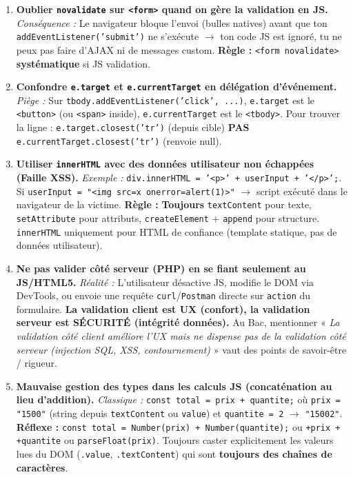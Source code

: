 \documentclass[11pt]{article}
\newcommand{\cle}[1]{{\popxbold\color{popdark}#1}}
\begin{document}
\begin{attention}
    \begin{enumerate}
        \item \textbf{Oublier \texttt{novalidate} sur \texttt{<form>} quand on gère la validation en JS.}
              \textit{Conséquence :} Le navigateur bloque l'envoi (bulles natives) avant que ton \texttt{addEventListener('submit')} ne s'exécute $\rightarrow$ ton code JS est ignoré, tu ne peux pas faire d'AJAX ni de messages custom. \textbf{Règle :} \texttt{<form novalidate>} \textbf{systématique} si JS validation.
        \item \textbf{Confondre \texttt{e.target} et \texttt{e.currentTarget} en délégation d'événement.}
              \textit{Piège :} Sur \texttt{tbody.addEventListener('click', ...)}, \texttt{e.target} est le \texttt{<button>} (ou \texttt{<span>} inside), \texttt{e.currentTarget} est le \texttt{<tbody>}. Pour trouver la ligne : \texttt{e.target.closest('tr')} (depuis cible) \textbf{PAS} \texttt{e.currentTarget.closest('tr')} (renvoie null).
        \item \textbf{Utiliser \texttt{innerHTML} avec des données utilisateur non échappées (Faille \cle{XSS}).}
              \textit{Exemple :} \texttt{div.innerHTML = '<p>' + userInput + '</p>';}. Si \texttt{userInput = "<img src=x onerror=alert(1)>"} $\rightarrow$ script exécuté dans le navigateur de la victime. \textbf{Règle :} \textbf{Toujours} \texttt{textContent} pour texte, \texttt{setAttribute} pour attributs, \texttt{createElement} + \texttt{append} pour structure. \texttt{innerHTML} uniquement pour HTML de confiance (template statique, pas de données utilisateur).
        \item \textbf{Ne pas valider côté serveur (PHP) en se fiant seulement au JS/HTML5.}
              \textit{Réalité :} L'utilisateur désactive JS, modifie le DOM via DevTools, ou envoie une requête \texttt{curl}/\texttt{Postman} directe sur \texttt{action} du formulaire. \textbf{La validation client est UX (confort), la validation serveur est SÉCURITÉ (intégrité données).} Au Bac, mentionner « \textit{La validation côté client améliore l'UX mais ne dispense pas de la validation côté serveur (injection SQL, XSS, contournement) } » vaut des points de savoir-être / rigueur.
        \item \textbf{Mauvaise gestion des types dans les calculs JS (concaténation au lieu d'addition).}
              \textit{Classique :} \texttt{const total = prix + quantite;} où \texttt{prix = "1500"} (string depuis \texttt{textContent} ou \texttt{value}) et \texttt{quantite = 2} $\rightarrow$ \texttt{"15002"}. \textbf{Réflexe :} \texttt{const total = Number(prix) + Number(quantite);} ou \texttt{+prix + +quantite} ou \texttt{parseFloat(prix)}. Toujours caster explicitement les valeurs lues du DOM (\texttt{.value}, \texttt{.textContent}) qui sont \textbf{toujours des chaînes de caractères}.
    \end{enumerate}
\end{attention}
\end{document}
